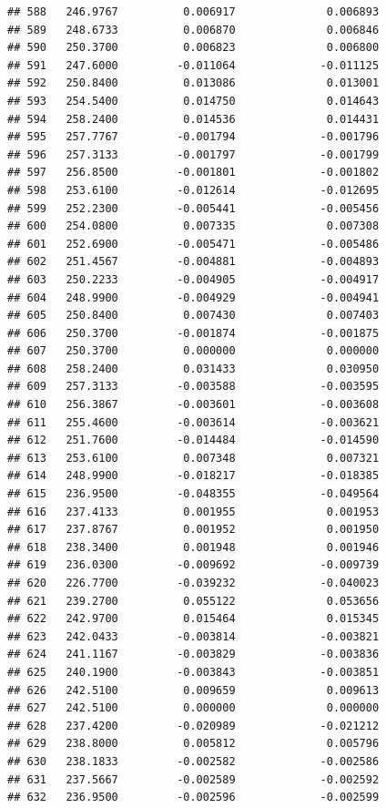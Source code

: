 \documentclass[
]{article}
\begin{document}
\begin{verbatim}
## 588   246.9767          0.006917              0.006893
## 589   248.6733          0.006870              0.006846
## 590   250.3700          0.006823              0.006800
## 591   247.6000         -0.011064             -0.011125
## 592   250.8400          0.013086              0.013001
## 593   254.5400          0.014750              0.014643
## 594   258.2400          0.014536              0.014431
## 595   257.7767         -0.001794             -0.001796
## 596   257.3133         -0.001797             -0.001799
## 597   256.8500         -0.001801             -0.001802
## 598   253.6100         -0.012614             -0.012695
## 599   252.2300         -0.005441             -0.005456
## 600   254.0800          0.007335              0.007308
## 601   252.6900         -0.005471             -0.005486
## 602   251.4567         -0.004881             -0.004893
## 603   250.2233         -0.004905             -0.004917
## 604   248.9900         -0.004929             -0.004941
## 605   250.8400          0.007430              0.007403
## 606   250.3700         -0.001874             -0.001875
## 607   250.3700          0.000000              0.000000
## 608   258.2400          0.031433              0.030950
## 609   257.3133         -0.003588             -0.003595
## 610   256.3867         -0.003601             -0.003608
## 611   255.4600         -0.003614             -0.003621
## 612   251.7600         -0.014484             -0.014590
## 613   253.6100          0.007348              0.007321
## 614   248.9900         -0.018217             -0.018385
## 615   236.9500         -0.048355             -0.049564
## 616   237.4133          0.001955              0.001953
## 617   237.8767          0.001952              0.001950
## 618   238.3400          0.001948              0.001946
## 619   236.0300         -0.009692             -0.009739
## 620   226.7700         -0.039232             -0.040023
## 621   239.2700          0.055122              0.053656
## 622   242.9700          0.015464              0.015345
## 623   242.0433         -0.003814             -0.003821
## 624   241.1167         -0.003829             -0.003836
## 625   240.1900         -0.003843             -0.003851
## 626   242.5100          0.009659              0.009613
## 627   242.5100          0.000000              0.000000
## 628   237.4200         -0.020989             -0.021212
## 629   238.8000          0.005812              0.005796
## 630   238.1833         -0.002582             -0.002586
## 631   237.5667         -0.002589             -0.002592
## 632   236.9500         -0.002596             -0.002599

\end{verbatim}
\end{document}
